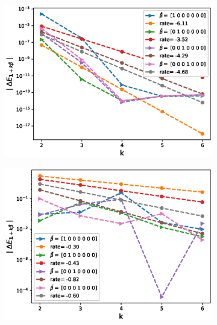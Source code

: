 \begin{figure}[htb]
\begin{subfigure}{0.4\textwidth}
		\includegraphics[width=\linewidth]{./figures/Heston_single_call_QE_moment_matching/mixed_rates/set4/N_4/first_difference_heston_4steps_hierarchical}
		\caption{}
		\label{fig:3}
	\end{subfigure}
		\begin{subfigure}{0.4\textwidth}
		\includegraphics[width=\linewidth]{./figures/Heston_single_call_smooth_vol/mixed_rates/set4/N_4/first_difference_heston_4steps_spot_hierarchical}
		\caption{}
		\label{fig:4}
	\end{subfigure}

\end{figure}
